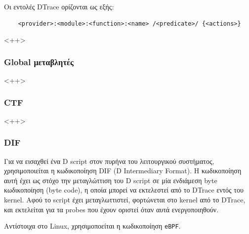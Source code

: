 \documentclass[12pt]{article}
\begin{document}
Οι εντολές DTrace ορίζονται ως εξής:

\begin{lstlisting}
	<provider>:<module>:<function>:<name> /<predicate>/ {<actions>}
\end{lstlisting}

<++>

\subsubsection{Global μεταβλητές}


<++>

\subsubsection{CTF}

%			
%

<++>

\subsubsection{DIF}


Για να εισαχθεί ένα D script στον πυρήνα του λειτουργικού συστήματος,
χρησιμοποιείται η κωδικοποίηση DIF (D Intermediary Format). Η κωδικοποίηση αυτή
έχει ως στόχο την μεταγλώττιση του D script σε μία ενδιάμεση byte κωδικοποίηση
(byte code), η οποία μπορεί να εκτελεστεί από το DTrace εντός του kernel. Αφού
το script έχει μεταγλωττιστεί, φορτώνεται στο kernel από το DTrace, και
εκτελείται για τα probes που έχουν οριστεί όταν αυτά ενεργοποιηθούν.

Αντίστοιχα στο Linux, χρησιμοποείται η κωδικοποίηση \lstinline{eBPF}.
\end{document}
